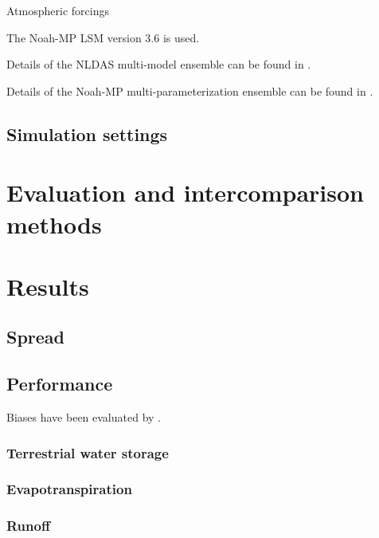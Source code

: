 \documentclass[essd]{copernicus}
\begin{document}
Atmospheric forcings

The Noah-MP LSM version 3.6 is used.

Details of the NLDAS multi-model ensemble can be found in \citet{xia2012JGRA, xia2012JGRAa, fei2021WRR}.

Details of the Noah-MP multi-parameterization ensemble can be found in \citet{zheng2019WRR, zheng2020JAMES, fei2021WRR}.


\subsection{Simulation settings} \label{sec:data:simulation}


\section{Evaluation and intercomparison methods} \label{sec:evaluation}


\section{Results} \label{sec:result}

\subsection{Spread}

\subsection{Performance}

Biases have been evaluated by \citet{zheng2020JAMES}.

\subsubsection{Terrestrial water storage}

\citep{landerer2012WRR}


\subsubsection{Evapotranspiration}

\subsubsection{Runoff}


 \label{sec:availability}
\end{document}
